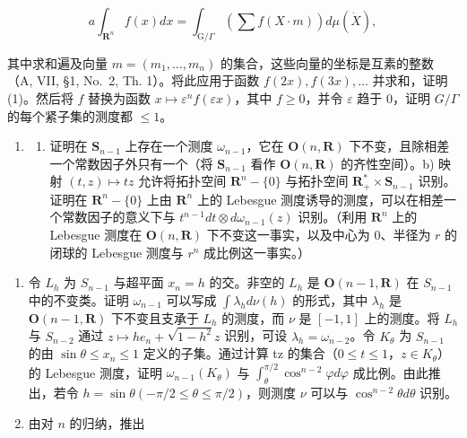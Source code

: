 \[
a \int_ {\mathbf {R} ^ {n}} f (x) d x = \int_ {\mathrm{G} / \Gamma} \left(\sum f (X \cdot m)\right) d \mu (\dot {X}),
\]

其中求和遍及向量 \(m = (m_1, \ldots, m_n)\) 的集合，这些向量的坐标是互素的整数（A, VII, §1, No.~2, Th. 1）。将此应用于函数 \(f(2x), f(3x), \ldots\) 并求和，证明 (1)。然后将 \(f\) 替换为函数 \(x \mapsto \varepsilon^n f(\varepsilon x)\)，其中 \(f \geqslant 0\)，并令 \(\varepsilon\) 趋于 0，证明 \(G/\Gamma\) 的每个紧子集的测度都 \(\leqslant 1\)。

\begin{enumerate}
\def\labelenumi{\arabic{enumi})}
\setcounter{enumi}{7}
\tightlist
\item
  \begin{enumerate}
  \def\labelenumii{\alph{enumii})}
  \tightlist
  \item
    证明在 \(\mathbf{S}_{n-1}\) 上存在一个测度 \(\omega_{n-1}\)，它在 \(\mathbf{O}(n,\mathbf{R})\) 下不变，且除相差一个常数因子外只有一个（将 \(\mathbf{S}_{n-1}\) 看作 \(\mathbf{O}(n,\mathbf{R})\) 的齐性空间）。b) 映射 \((t,z)\mapsto tz\) 允许将拓扑空间 \(\mathbf{R}^n -\{0\}\) 与拓扑空间 \(\mathbf{R}_+^*\times \mathbf{S}_{n-1}\) 识别。证明在 \(\mathbf{R}^n -\{0\}\) 上由 \(\mathbf{R}^n\) 上的 Lebesgue 测度诱导的测度，可以在相差一个常数因子的意义下与 \(t^{n-1}dt\otimes d\omega_{n-1}(z)\) 识别。（利用 \(\mathbf{R}^n\) 上的 Lebesgue 测度在 \(\mathbf{O}(n,\mathbf{R})\) 下不变这一事实，以及中心为 0、半径为 \(r\) 的闭球的 Lebesgue 测度与 \(r^n\) 成比例这一事实。）
  \end{enumerate}
\end{enumerate}

\begin{enumerate}
\def\labelenumi{\alph{enumi})}
\setcounter{enumi}{2}
\item
  令 \(L_{h}\) 为 \(S_{n-1}\) 与超平面 \(x_{n}=h\) 的交。非空的 \(L_{h}\) 是 \(\mathbf{O}(n-1,\mathbf{R})\) 在 \(S_{n-1}\) 中的不变类。证明 \(\omega_{n-1}\) 可以写成 \(\int\lambda_{h}d\nu(h)\) 的形式，其中 \(\lambda_{h}\) 是 \(\mathbf{O}(n-1,\mathbf{R})\) 下不变且支承于 \(L_{h}\) 的测度，而 \(\nu\) 是 \([-1,1]\) 上的测度。将 \(L_{h}\) 与 \(S_{n-2}\) 通过 \(z\mapsto he_{n}+\sqrt{1-h^{2}}z\) 识别，可设 \(\lambda_{h}=\omega_{n-2}\)。令 \(K_{\theta}\) 为 \(S_{n-1}\) 的由 \(\sin\theta\leqslant x_{n}\leqslant1\) 定义的子集。通过计算 tz 的集合（\(0\leqslant t\leqslant1\)，\(z\in K_{\theta}\)）的 Lebesgue 测度，证明 \(\omega_{n-1}(K_{\theta})\) 与 \(\int_{\theta}^{\pi/2}\cos^{n-2}\varphi d\varphi\) 成比例。由此推出，若令 \(h=\sin\theta(-\pi/2\leqslant\theta\leqslant\pi/2)\)，则测度 \(\nu\) 可以与 \(\cos^{n-2}\theta d\theta\) 识别。
\item
  由对 \(n\) 的归纳，推出
\end{enumerate}

